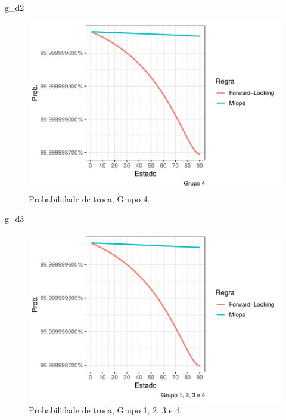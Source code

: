 \documentclass[12pt,a4paper]{article}
\newenvironment{Shaded}{\begin{snugshade}}{\end{snugshade}}
\newcommand{\NormalTok}[1]{#1}
\begin{document}
\begin{Shaded}
\begin{Highlighting}[]
\NormalTok{g_d2}
\end{Highlighting}
\end{Shaded}

\begin{figure}
\centering
\includegraphics{Lista_econometria_II_files/figure-latex/unnamed-chunk-6-1.pdf}
\caption{Probabilidade de troca, Grupo 4. \label{fig:2}}
\end{figure}

\begin{Shaded}
\begin{Highlighting}[]
\NormalTok{g_d3}
\end{Highlighting}
\end{Shaded}

\begin{figure}
\centering
\includegraphics{Lista_econometria_II_files/figure-latex/unnamed-chunk-7-1.pdf}
\caption{Probabilidade de troca, Grupo 1, 2, 3 e 4. \label{fig:3}}
\end{figure}
\end{document}

